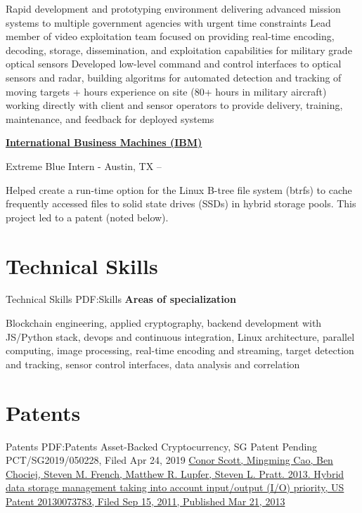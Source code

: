 \documentclass[a4paper,10pt,oneside]{article}
\begin{document}
\begin{minipage}[t][0pt]{\linewidth}
\begin{body}
\begin{detail}
\BulletItem
Rapid development and prototyping environment delivering advanced mission systems to multiple government agencies with urgent time constraints
\BulletItem
Lead member of video exploitation team focused on providing real-time encoding, decoding, storage, dissemination, and exploitation capabilities for military grade optical sensors
\BulletItem
Developed low-level command and control interfaces to optical sensors and radar, building algoritms for automated detection and tracking of moving targets
+ hours experience on site (80+ hours in military aircraft) working directly with client and sensor operators to provide delivery, training, maintenance, and feedback for deployed systems
\end{detail}

\EntryGap

\href{www.ibm.com}
{\textbf{International Business Machines (IBM)}}
\par
Extreme Blue Intern - Austin, TX
\hfill
{} --
\begin{detail}
\BulletItem
Helped create a run-time option for the Linux B-tree file system (btrfs) to cache frequently accessed files to solid state drives (SSDs) in hybrid storage pools. This project led to a patent (noted below).
\end{detail}


\section
{Technical Skills}
{Technical Skills}
{PDF:Skills}
\textbf{Areas of specialization}
\par Blockchain engineering, applied cryptography, backend development with JS/Python stack, devops and continuous integration, Linux architecture, parallel computing, image processing, real-time encoding and streaming, target detection and tracking, sensor control interfaces, data analysis and correlation
\newline


\section
{Patents}
{Patents}
{PDF:Patents}
{Asset-Backed Cryptocurrency, SG Patent Pending PCT/SG2019/050228, Filed Apr 24, 2019  }
\newline
\newline
\href{https://www.google.com/patents/US20130073783}
{Conor Scott, Mingming Cao, Ben Chociej, Steven M. French, Matthew R. Lupfer, Steven L. Pratt. 2013. Hybrid data storage management taking into account input/output (I/O) priority, US Patent 20130073783, Filed Sep 15, 2011, Published Mar 21, 2013 }
\end{body}
\end{minipage}
\label{LastPage}
\end{document}
